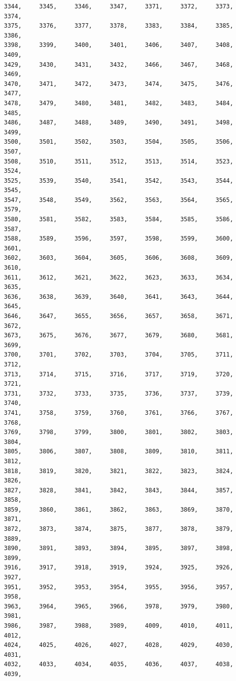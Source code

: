 \documentclass[a4paper,11pt]{report}
\begin{document}
\begin{verbatim}
3344,     3345,     3346,     3347,     3371,     3372,     3373,     3374,
3375,     3376,     3377,     3378,     3383,     3384,     3385,     3386,
3398,     3399,     3400,     3401,     3406,     3407,     3408,     3409,
3429,     3430,     3431,     3432,     3466,     3467,     3468,     3469,
3470,     3471,     3472,     3473,     3474,     3475,     3476,     3477,
3478,     3479,     3480,     3481,     3482,     3483,     3484,     3485,
3486,     3487,     3488,     3489,     3490,     3491,     3498,     3499,
3500,     3501,     3502,     3503,     3504,     3505,     3506,     3507,
3508,     3510,     3511,     3512,     3513,     3514,     3523,     3524,
3525,     3539,     3540,     3541,     3542,     3543,     3544,     3545,
3547,     3548,     3549,     3562,     3563,     3564,     3565,     3579,
3580,     3581,     3582,     3583,     3584,     3585,     3586,     3587,
3588,     3589,     3596,     3597,     3598,     3599,     3600,     3601,
3602,     3603,     3604,     3605,     3606,     3608,     3609,     3610,
3611,     3612,     3621,     3622,     3623,     3633,     3634,     3635,
3636,     3638,     3639,     3640,     3641,     3643,     3644,     3645,
3646,     3647,     3655,     3656,     3657,     3658,     3671,     3672,
3673,     3675,     3676,     3677,     3679,     3680,     3681,     3699,
3700,     3701,     3702,     3703,     3704,     3705,     3711,     3712,
3713,     3714,     3715,     3716,     3717,     3719,     3720,     3721,
3731,     3732,     3733,     3735,     3736,     3737,     3739,     3740,
3741,     3758,     3759,     3760,     3761,     3766,     3767,     3768,
3769,     3798,     3799,     3800,     3801,     3802,     3803,     3804,
3805,     3806,     3807,     3808,     3809,     3810,     3811,     3812,
3818,     3819,     3820,     3821,     3822,     3823,     3824,     3826,
3827,     3828,     3841,     3842,     3843,     3844,     3857,     3858,
3859,     3860,     3861,     3862,     3863,     3869,     3870,     3871,
3872,     3873,     3874,     3875,     3877,     3878,     3879,     3889,
3890,     3891,     3893,     3894,     3895,     3897,     3898,     3899,
3916,     3917,     3918,     3919,     3924,     3925,     3926,     3927,
3951,     3952,     3953,     3954,     3955,     3956,     3957,     3958,
3963,     3964,     3965,     3966,     3978,     3979,     3980,     3981,
3986,     3987,     3988,     3989,     4009,     4010,     4011,     4012,
4024,     4025,     4026,     4027,     4028,     4029,     4030,     4031,
4032,     4033,     4034,     4035,     4036,     4037,     4038,     4039,

\end{verbatim}
\end{document}
